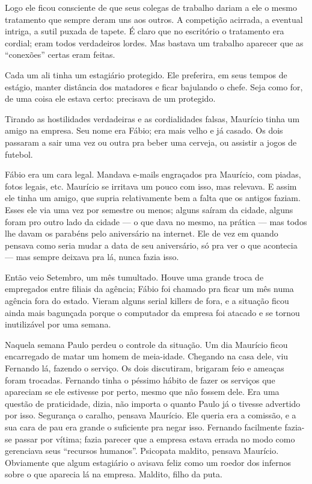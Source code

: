 Logo ele ficou consciente de que seus colegas de trabalho dariam a ele o mesmo tratamento que sempre deram uns aos outros. A competição acirrada, a eventual intriga, a sutil puxada de tapete. É claro que no escritório o tratamento era cordial; eram todos verdadeiros lordes. Mas bastava um trabalho aparecer que as “conexões” certas eram feitas.

Cada um ali tinha um estagiário protegido. Ele preferira, em seus tempos de estágio, manter distância dos matadores e ficar bajulando o chefe. Seja como for, de uma coisa ele estava certo: precisava de um protegido.

Tirando as hostilidades verdadeiras e as cordialidades falsas, Maurício tinha um amigo na empresa. Seu nome era Fábio; era mais velho e já casado. Os dois passaram a sair uma vez ou outra pra beber uma cerveja, ou assistir a jogos de futebol.

Fábio era um cara legal. Mandava e-mails engraçados pra Maurício, com piadas, fotos legais, etc. Maurício se irritava um pouco com isso, mas relevava. E assim ele tinha um amigo, que supria relativamente bem a falta que os antigos faziam. Esses ele via uma vez por semestre ou menos; alguns saíram da cidade, alguns foram pro outro lado da cidade --- o que dava no mesmo, na prática --- mas todos lhe davam os parabéns pelo aniversário na internet. Ele de vez em quando pensava como seria mudar a data de seu aniversário, só pra ver o que acontecia --- mas sempre deixava pra lá, nunca fazia isso.

Então veio Setembro, um mês tumultado. Houve uma grande troca de empregados entre filiais da agência; Fábio foi chamado pra ficar um mês numa agência fora do estado. Vieram alguns serial killers de fora, e a situação ficou ainda mais bagunçada porque o computador da empresa foi atacado e se tornou inutilizável por uma semana.

Naquela semana Paulo perdeu o controle da situação. Um dia Maurício ficou encarregado de matar um homem de meia-idade. Chegando na casa dele, viu Fernando lá, fazendo o serviço. Os dois discutiram, brigaram feio e ameaças foram trocadas. Fernando tinha o péssimo hábito de fazer os serviços que apareciam se ele estivesse por perto, mesmo que não fossem dele. Era uma questão de praticidade, dizia, não importa o quanto Paulo já o tivesse advertido por isso. Segurança o caralho, pensava Maurício. Ele queria era a comissão, e a sua cara de pau era grande o suficiente pra negar isso. Fernando facilmente fazia-se passar por vítima; fazia parecer que a empresa estava errada no modo como gerenciava seus ``recursos humanos''. Psicopata maldito, pensava Maurício. Obviamente que algum estagiário o avisava feliz como um roedor dos infernos sobre o que aparecia lá na empresa. Maldito, filho da puta.

